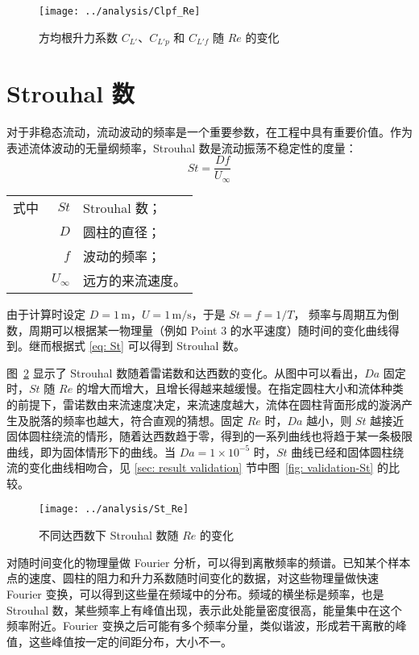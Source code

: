 \begin{figure}
	\centering
	\texttt{[image: ../analysis/Clpf\_Re]}
	\caption{方均根升力系数 $C_{L'}$、$C_{L'p}$ 和 $C_{L'f}$ 随 $Re$ 的变化}
	\label{fig: rmsCl}
\end{figure}

\section{Strouhal 数}\label{sec: St}

对于非稳态流动，流动波动的频率是一个重要参数，在工程中具有重要价值。作为表述流体波动的无量纲频率，Strouhal 数是流动振荡不稳定性的度量：
\begin{equation}\label{eq: St}
	St = \frac{Df}{U_{\infty}}
\end{equation}
\begin{tabularx}{\textwidth}{@{}l@{\quad}r@{——}X@{}}
	式中 & $St$ & Strouhal 数；\\
		& $D$ & 圆柱的直径；\\
		& $f$ & 波动的频率；\\
		& $U_{\infty}$ & 远方的来流速度。 
\end{tabularx}\vspace{3.15bp}
由于计算时设定 $D=1\,\mathrm{m}$，$U=1\,\mathrm{m/s}$，于是 $St=f=1/T$，
频率与周期互为倒数，周期可以根据某一物理量（例如 Point 3 的水平速度）随时间的变化曲线得到。继而根据式 \eqref{eq: St} 可以得到 Strouhal 数。

图~\ref{fig: St} 显示了 Strouhal 数随着雷诺数和达西数的变化。从图中可以看出，$Da$ 固定时，$St$ 随 $Re$ 的增大而增大，且增长得越来越缓慢。在指定圆柱大小和流体种类的前提下，雷诺数由来流速度决定，来流速度越大，流体在圆柱背面形成的漩涡产生及脱落的频率也越大，符合直观的猜想。固定 $Re$ 时，$Da$ 越小，则 $St$ 越接近固体圆柱绕流的情形，随着达西数趋于零，得到的一系列曲线也将趋于某一条极限曲线，即为固体情形下的曲线。当 $Da=1 \times 10^{-5}$ 时，$St$ 曲线已经和固体圆柱绕流的变化曲线相吻合，见 \ref{sec: result validation} 节中图~\ref{fig: validation-St} 的比较。

\begin{figure}
	\centering
	\texttt{[image: ../analysis/St\_Re]}
	\caption{不同达西数下 Strouhal 数随 $Re$ 的变化}
	\label{fig: St}
\end{figure}

对随时间变化的物理量做 Fourier 分析，可以得到离散频率的频谱。已知某个样本点的速度、圆柱的阻力和升力系数随时间变化的数据，对这些物理量做快速 Fourier 变换，可以得到这些量在频域中的分布。频域的横坐标是频率，也是 Strouhal 数，某些频率上有峰值出现，表示此处能量密度很高，能量集中在这个频率附近。Fourier 变换之后可能有多个频率分量，类似谐波，形成若干离散的峰值，这些峰值按一定的间距分布，大小不一。%

